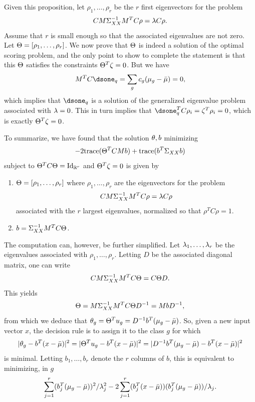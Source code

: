Given this proposition, let $\rho_1, \ldots, \rho_r$ be the $r$ first  eigenvectors for the problem
\begin{equation}
\label{eq:ge.os}
CM\Sigma_{XX}^{-1} M^T C\rho = \lambda C\rho.
\end{equation}
Assume that $r$ is small enough so that the associated eigenvalues are not zero.
Let  $\Theta = [\rho_1, \ldots, \rho_r]$. We now prove that $\Theta$ is indeed a solution of the optimal scoring problem, and the only point to show to complete the statement is that this $\Theta$ satisfies the constraints  $\Theta^T\zeta = 0$.
 But we have
\[
M^TC\dsone_q = \sum_{g} c_g (\mu_g - \bar\mu) = 0, 
\]
which implies that $\dsone_q$ is a solution of the generalized eigenvalue problem associated with $\lambda = 0$. This in turn implies that $\dsone_q^T C \rho_i  = \ze^T \rho_i=  0$, which is exactly $\Theta^T\zeta  = 0$.  
\bigskip

To summarize, we have  found that the solution $\theta, b$ minimizing 
\[
- 2{\mathrm{trace}}(\Theta^TCMb) + {\mathrm{trace}}(b^T\Sigma_{XX}b)
\]
subject to $\Th^T C \Th= \Id[r]$ and $\Theta^T\zeta = 0$ is given by
\begin{enumerate}[label=(\roman*)]
\item $\Theta = [\rho_1, \ldots, \rho_r]$ where $\rho_1, \ldots, \rho_r$ are the eigenvectors for the problem
\[
CM\Sigma_{XX}^{-1} M^T C\rho = \lambda C\rho
\]
associated with the $r$ largest eigenvalues, normalized so that $\rho^TC\rho = 1$. 
\item $b = \Sigma_{XX}^{-1} M^TC\Theta$.
\end{enumerate}

The computation can, however, be further simplified.
Let $\lambda_1, \ldots, \lambda_r$ be the eigenvalues associated with $\rho_1, \ldots, \rho_r$. Letting $D$ be the associated diagonal matrix, one can write
\[
CM\Sigma_{XX}^{-1} M^T C\Theta = C\Theta D.
\]
This yields
\[
\Theta = M\Sigma_{XX}^{-1} M^T C\Theta D^{-1} = MbD^{-1},
\]
from which we deduce that $\theta_g = \Theta^T u_g = D^{-1} b^T(\mu_g - \bar\mu)$. So, given a new input vector $x$, the decision rule is to assign it to the class $g$ for which 
\[
|\theta_g - b^T(x-\bar\mu)|^2 =  |\Theta^T u_g - b^T(x-\bar\mu)|^2 = |D^{-1} b^T(\mu_g - \bar\mu) - b^T(x-\bar\mu)|^2
\]
is minimal. Letting $b_1, \ldots, b_r$ denote the $r$ columns of $b$, this is equivalent to minimizing, in $g$
\begin{equation}
\label{eq:os.rule}
\sum_{j=1}^r (b_j^T (\mu_g - \bar\mu))^2/\lambda_j^2 - 2 \sum_{j=1}^r (b_j^T (x - \bar\mu))(b_j^T (\mu_g - \bar\mu))/\lambda_j.
\end{equation}


